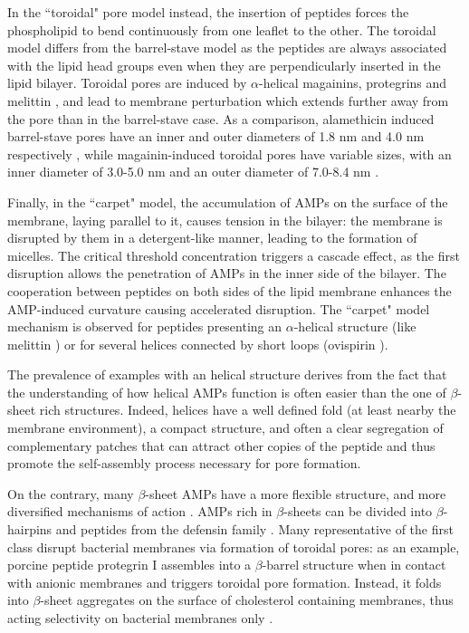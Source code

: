 In the ``toroidal" pore model instead, the insertion of peptides forces the phospholipid to bend continuously from one leaflet to the other.
%
The toroidal model differs from the barrel-stave model as the peptides are always associated with the lipid head groups even when they are perpendicularly inserted in the lipid  bilayer. Toroidal pores are induced by $\alpha$-helical magainins, protegrins and melittin \citep{Yang2001,Matsuzaki1996,Hallock2003}, and lead to membrane perturbation which extends further away from the pore than in the barrel-stave case. As a comparison, alamethicin induced barrel-stave pores have an inner and outer diameters of 1.8 nm and 4.0 nm respectively \citep{Spaar2004}, while magainin-induced toroidal pores have variable sizes, with an inner diameter of 3.0-5.0 nm and an outer diameter of 7.0-8.4 nm \citep{Matsuzaki1997}.

Finally, in the ``carpet" model, the accumulation of AMPs on the surface of the membrane, laying parallel to it, causes tension in the bilayer: the membrane is disrupted by them in a detergent-like manner, leading to the formation of micelles.
%
The critical threshold concentration triggers a cascade effect, as the first disruption allows the penetration of AMPs in the inner side of the bilayer. The cooperation between peptides on both sides of the lipid membrane enhances the AMP-induced curvature causing accelerated disruption.
%
The ``carpet" model mechanism is observed for peptides presenting an $\alpha$-helical structure (like melittin \citep{Ladokhin2001}) or for several helices connected by short loops (ovispirin \citep{Yamaguchi2001}).

The prevalence of examples with an helical structure derives from the fact that the understanding of how helical AMPs function is often easier than the one of $\beta$-sheet rich structures.
%
Indeed, helices have a well defined fold (at least nearby the membrane environment), a compact structure, and often a clear segregation of complementary patches that can attract other copies of the peptide and thus promote the self-assembly process necessary for pore formation.

On the contrary, many $\beta$-sheet AMPs have a more flexible structure, and more diversified mechanisms of action \citep{Nguyen2011,Mahlapuu2016}.
%
AMPs rich in $\beta$-sheets can be divided into $\beta$-hairpins and peptides from the defensin family \citep{Nguyen2011}.
%
Many representative of the first class disrupt bacterial membranes via formation of toroidal pores: as an example, porcine peptide protegrin I assembles into a $\beta$-barrel structure when in contact with anionic membranes and triggers toroidal pore formation. Instead, it folds into $\beta$-sheet aggregates on the surface of cholesterol containing membranes, thus acting selectivity on bacterial membranes only \citep{Tang2009}.

